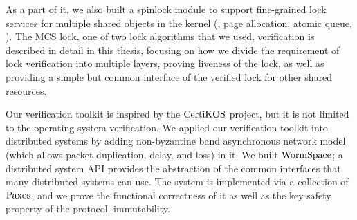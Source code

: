 As a part of it, 
we also built a spinlock module to support fine-grained lock services for multiple shared objects in the kernel 
(\ie, page allocation, atomic queue, \etc).
The MCS lock, one of two lock algorithms that we used, verification
is described in detail in this thesis, 
focusing on how we divide the requirement of 
lock verification into multiple layers, proving liveness of the lock, as well as
providing a simple but common interface of the verified lock for other shared resources. 


Our verification toolkit is inspired by the $\mathrm{CertiKOS}$ project,
but it is not limited to the operating system verification. 
We applied our verification toolkit into distributed systems by adding non-byzantine band asynchronous network model (which allows packet duplication, delay, and loss)  in it.
We built  $\mathrm{WormSpace}$; a distributed system API provides the abstraction of the common interfaces that many distributed systems can use.
The system is implemented via a collection of $\mathrm{Paxos}$,
and we prove the functional correctness of it as well as the key safety property of the protocol, immutability. 
%
%









